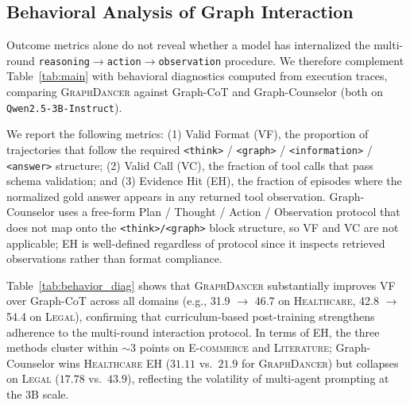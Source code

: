 \documentclass[11pt]{article}
\newcommand{\ours}{\textsc{GraphDancer}\xspace}
\begin{document}
\subsection{Behavioral Analysis of Graph Interaction}
\label{sec:appendix_behavior}

Outcome metrics alone do not reveal whether a model has internalized the multi-round \texttt{reasoning$\rightarrow$action$\rightarrow$observation} procedure. We therefore complement Table~\ref{tab:main} with behavioral diagnostics computed from execution traces, comparing \ours against Graph-CoT and Graph-Counselor (both on \texttt{Qwen2.5-3B-Instruct}).

We report the following metrics: (1) Valid Format (\textsc{VF}), the proportion of trajectories that follow the required \texttt{<think>} / \texttt{<graph>} / \texttt{<information>} / \texttt{<answer>} structure; (2) Valid Call (\textsc{VC}), the fraction of tool calls that pass schema validation; and (3) Evidence Hit (\textsc{EH}), the fraction of episodes where the normalized gold answer appears in any returned tool observation. Graph-Counselor uses a free-form Plan / Thought / Action / Observation protocol that does not map onto the \texttt{<think>/<graph>} block structure, so \textsc{VF} and \textsc{VC} are not applicable; \textsc{EH} is well-defined regardless of protocol since it inspects retrieved observations rather than format compliance.

Table~\ref{tab:behavior_diag} shows that \ours substantially improves \textsc{VF} over Graph-CoT across all domains (e.g., 31.9 $\to$ 46.7 on \textsc{Healthcare}, 42.8 $\to$ 54.4 on \textsc{Legal}), confirming that curriculum-based post-training strengthens adherence to the multi-round interaction protocol. In terms of EH, the three methods cluster within $\sim$3 points on \textsc{E-commerce} and \textsc{Literature}; Graph-Counselor wins \textsc{Healthcare} \textsc{EH} ($31.11$ vs.\ $21.9$ for \ours) but collapses on \textsc{Legal} ($17.78$ vs.\ $43.9$), reflecting the volatility of multi-agent prompting at the 3B scale.
\end{document}
